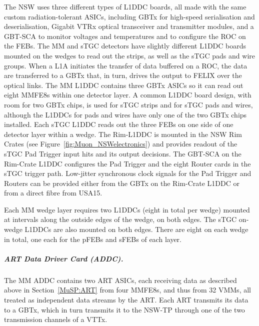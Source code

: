 \documentclass[cernpreprint, atlasdraft=false, UKenglish,british,orcidlogo, texmf, orcidlogo]{atlasdoc}
\begin{document}
The \gls{NSW} uses three different types of \gls{L1DDC} boards, all made with the same custom radiation-tolerant \glspl{ASIC}, including \gls{GBTx} for high-speed serialisation and deserialisation,
Gigabit \gls{VTRx} optical transceiver and transmitter modules, and a \gls{GBT-SCA} to monitor voltages and temperatures and to configure the \gls{ROC} on the \glspl{FEB}.
The \gls{MM} and \gls{sTGC} detectors have slightly different \gls{L1DDC} boards mounted on the wedges to read out the strips, as well as the \gls{sTGC} pads and wire groups. When a \gls{L1A} initiates the transfer of data buffered on a \gls{ROC}, the data are transferred to a \gls{GBTx} that, in turn, drives the output to \gls{FELIX} over the optical links.
The \gls{MM} \gls{L1DDC} contains three \gls{GBTx} \glspl{ASIC} so it can read out eight \glspl{MMFE8} within one detector layer.
A common \gls{L1DDC} board design, with room for two \gls{GBTx} chips, is used for \gls{sTGC} strips and for \gls{sTGC} pads and wires, although the \glspl{L1DDC} for pads and wires have only one of the two \gls{GBTx} chips installed.
Each \gls{sTGC} \gls{L1DDC} reads out the three \glspl{FEB} on one side of one detector layer within a wedge.
The Rim-\gls{L1DDC} is mounted in the \gls{NSW} Rim Crates (see Figure~\ref{fig:Muon_NSWelectronics}) and provides readout of the \gls{sTGC} Pad Trigger input hits and its output decisions.
The \gls{GBT-SCA} on the Rim-Crate \gls{L1DDC} configures the Pad Trigger and the eight Router cards in the \gls{sTGC} trigger path.
Low-jitter synchronous clock signals for the Pad Trigger and Routers can be provided either from the \gls{GBTx} on the Rim-Crate \gls{L1DDC} or from a direct fibre from \gls{USA15}.
 
Each \gls{MM} wedge layer requires two \glspl{L1DDC} (eight in total per wedge) mounted at intervals along the outside edges of the wedge, on both edges.
The \gls{sTGC} on-wedge \glspl{L1DDC} are also mounted on both edges.
There are eight on each wedge in total, one each for the \glspl{pFEB} and \glspl{sFEB} of each layer.
 
 
 
 
\subparagraph{ART Data Driver Card (ADDC). \label{MuSP:ADDC}}
The \gls{MM} \gls{ADDC} contains two \gls{ART} \glspl{ASIC},
each receiving data as described above in Section~\ref{MuSP:ART} from four \glspl{MMFE8}, and thus from \num{32} \glspl{VMM}, all treated as independent data streams by the \gls{ART}.
Each \gls{ART} transmits its data to a \gls{GBTx}, which in turn transmits it to the \gls{NSW-TP} through one of the two transmission channels of a \gls{VTTx}. 
 
\end{document}
